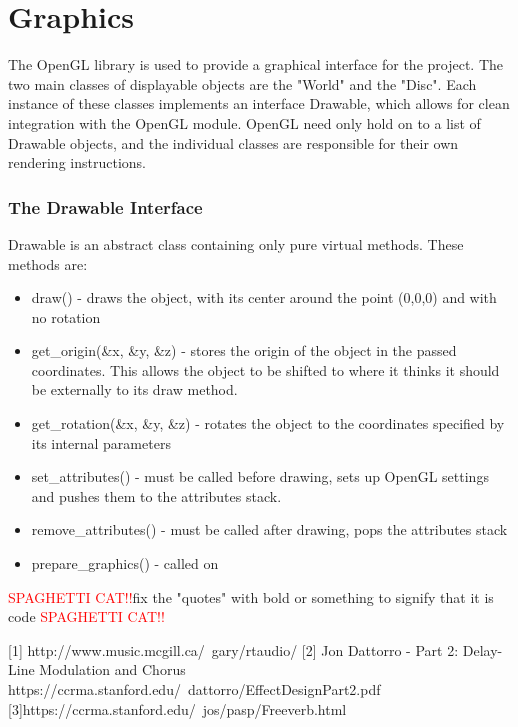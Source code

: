 \documentclass[pdftext,twoside,10pt]{article}
\newcommand{\spag}{\textcolor{red}{SPAGHETTI CAT!!}}
\begin{document}
\section{Graphics}
The OpenGL library is used to provide a graphical interface for the project. The two main classes of displayable objects are the "World" and the "Disc". Each instance of these classes implements an interface Drawable, which allows for clean integration with the OpenGL module. OpenGL need only hold on to a list of Drawable objects, and the individual classes are responsible for their own rendering instructions.

\subsubsection{The Drawable Interface}
Drawable is an abstract class containing only pure virtual methods. These methods are:

\begin{itemize}
    \item draw() - draws the object, with its center around the point (0,0,0) and with no rotation
    \item get_origin(\&x, \&y, \&z) - stores the origin of the object in the passed coordinates. This allows the object to be shifted to where it thinks it should be externally to its draw method.
    \item get_rotation(\&x, \&y, \&z) - rotates the object to the coordinates specified by its internal parameters
    \item set_attributes() - must be called before drawing, sets up OpenGL settings and pushes them to the attributes stack.
    \item remove_attributes() - must be called after drawing, pops the attributes stack
    \item prepare_graphics() - called on
\end{itemize} 

\spag fix the "quotes" with bold or something to signify that it is code \spag

[1] http://www.music.mcgill.ca/~gary/rtaudio/
[2] Jon Dattorro - Part 2: Delay-Line Modulation and Chorus  
https://ccrma.stanford.edu/~dattorro/EffectDesignPart2.pdf 
[3]https://ccrma.stanford.edu/~jos/pasp/Freeverb.html 
\end{document}
